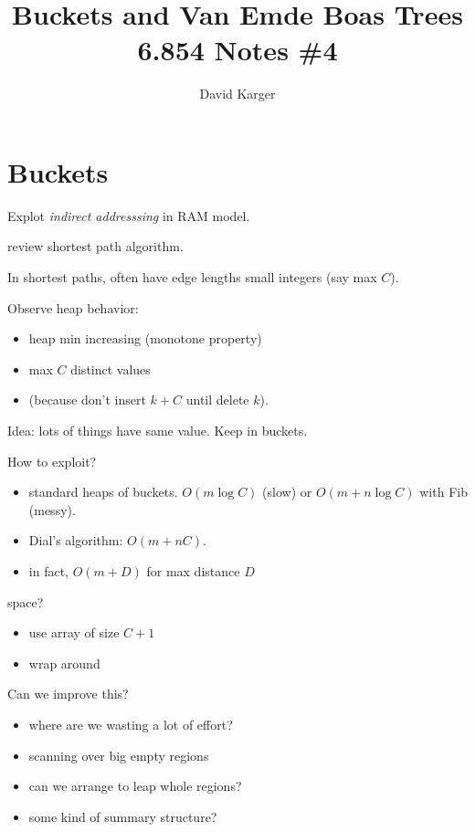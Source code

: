 \documentclass{article}
\title{Buckets and Van Emde Boas Trees\\ 6.854 Notes \#4}
\author{David Karger}
\begin{document}
\section{Buckets}

Explot \emph{indirect addresssing} in RAM model.

review shortest path algorithm.

In shortest paths, often have edge lengths small integers (say max
$C$).

Observe heap behavior:
\begin{itemize}
\item heap min increasing (monotone property)
\item max $C$ distinct values 
\item (because don't insert $k+C$ until delete $k$).
\end{itemize}

Idea: lots of things have same value.  Keep in buckets.

How to exploit?  
\begin{itemize}
\item standard heaps of buckets.  $O(m\log C)$
  (slow) or $O(m+n\log C)$ with Fib (messy).
\item Dial's algorithm: $O(m+nC)$.
\item in fact, $O(m+D)$ for max distance $D$
\end{itemize}

space?
\begin{itemize}
\item use array of size $C+1$
\item wrap around
\end{itemize}

Can we improve this?
\begin{itemize}
\item where are we wasting a lot of effort?
\item scanning over big empty regions
\item can we arrange to leap whole regions?
\item some kind of summary structure?
\end{itemize}
\end{document}

